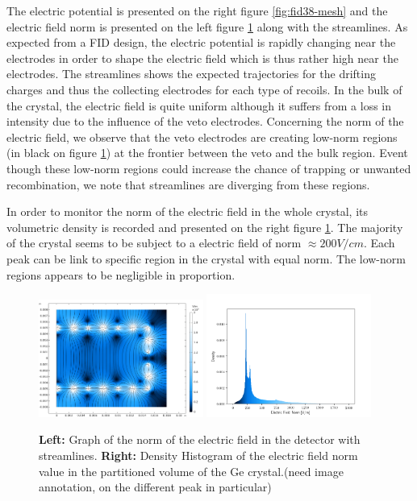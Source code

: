 The electric potential is presented on the right figure \ref{fig:fid38-mesh} and the electric field norm is presented on the left figure \ref{fig:fid38-enorm} along with the streamlines. As expected from a FID design, the electric potential is rapidly changing near the electrodes in order to shape the electric field which is thus rather high near the electrodes. The streamlines shows the expected trajectories for the drifting charges and thus the collecting electrodes for each type of recoils. In the bulk of the crystal, the electric field is quite uniform although it suffers from a loss in intensity due to the influence of the veto electrodes. Concerning the norm of the electric field, we observe that the veto electrodes are creating low-norm regions (in black on figure \ref{fig:fid38-enorm}) at the frontier between the veto and the bulk region. Event though these low-norm regions could increase the chance of trapping or unwanted recombination, we note that streamlines are diverging from these regions.

In order to monitor the norm of the electric field in the whole crystal, its volumetric density is recorded and presented on the right figure \ref{fig:fid38-enorm}. The majority of the crystal seems to be subject to a electric field of norm $\approx 200 V/cm$. Each peak can be link to specific region in the crystal with equal norm. The low-norm regions appears to be negligible in proportion.

\begin{figure}
\centering
\includegraphics[width=0.48\textwidth]{Figures/Electrodes/electric_field_norm.png}
\includegraphics[width=0.48\textwidth]{Figures/Electrodes/hist_enorm.png}
\caption{
\textbf{Left:} Graph of the norm of the electric field in the detector with streamlines.
\textbf{Right:} Density Histogram of the electric field norm value in the partitioned volume of the Ge crystal.(need image annotation, on the different peak in particular)
}
\label{fig:fid38-enorm}
\end{figure}


